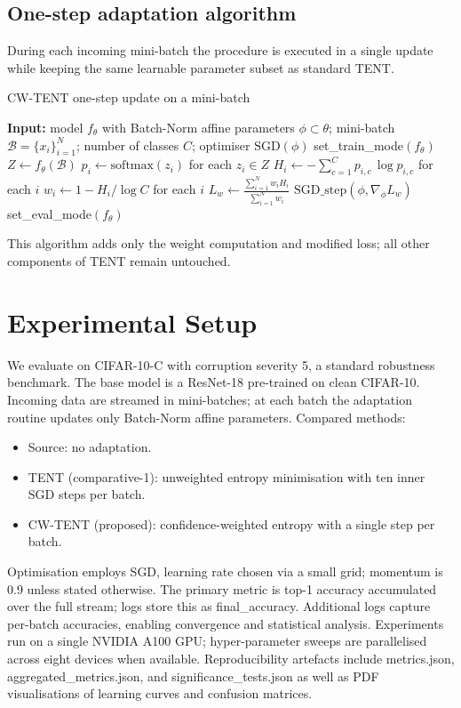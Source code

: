\documentclass{article} %
\begin{document}
\subsection{One-step adaptation algorithm}
During each incoming mini-batch the procedure is executed in a single update while keeping the same learnable parameter subset as standard TENT\@.
\begin{algorithm}
\caption{CW-TENT one-step update on a mini-batch}
\begin{algorithmic}[1]
\State{} \textbf{Input:} model \(f_{\theta}\) with Batch-Norm affine parameters \(\phi\subset\theta\); mini-batch \(\mathcal{B}={\{x_i\}}_{i=1}^{N}\); number of classes \(C\); optimiser \(\mathrm{SGD}(\phi)\)
\State{} set\_train\_mode\((f_{\theta})\) 
\State{} \(Z \leftarrow f_{\theta}(\mathcal{B})\) 
\State{} \(p_i \leftarrow \mathrm{softmax}(z_i)\) for each \(z_i\in Z\)
\State{} \(H_i \leftarrow -\sum_{c=1}^{C} p_{i,c}\,\log p_{i,c}\) for each \(i\)
\State{} \(w_i \leftarrow 1 - H_i/\log C\) for each \(i\)
\State{} \(L_w \leftarrow \frac{\sum_{i=1}^{N} w_i H_i}{\sum_{i=1}^{N} w_i}\)
\State{} \(\mathrm{SGD\_step}(\phi, \nabla_{\phi} L_w)\) 
\State{} set\_eval\_mode\((f_{\theta})\) 
\end{algorithmic}
\end{algorithm}
This algorithm adds only the weight computation and modified loss; all other components of TENT remain untouched.

\section{Experimental Setup}\label{sec:experimental}%
We evaluate on CIFAR-10-C with corruption severity 5, a standard robustness benchmark. The base model is a ResNet-18 pre-trained on clean CIFAR-10. Incoming data are streamed in mini-batches; at each batch the adaptation routine updates only Batch-Norm affine parameters.
Compared methods:
\begin{itemize}
  \item Source: no adaptation.
  \item TENT (comparative-1): unweighted entropy minimisation with ten inner SGD steps per batch.
  \item CW-TENT (proposed): confidence-weighted entropy with a single step per batch.
\end{itemize}
Optimisation employs SGD, learning rate chosen via a small grid; momentum is 0.9 unless stated otherwise. The primary metric is top-1 accuracy accumulated over the full stream; logs store this as final\_accuracy. Additional logs capture per-batch accuracies, enabling convergence and statistical analysis.
Experiments run on a single NVIDIA A100 GPU\@; hyper-parameter sweeps are parallelised across eight devices when available. Reproducibility artefacts include metrics.json, aggregated\_metrics.json, and significance\_tests.json as well as PDF visualisations of learning curves and confusion matrices.
\end{document}
